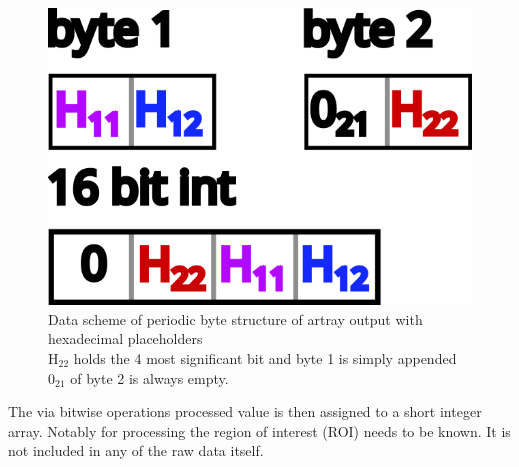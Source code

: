 \documentclass[twoside,openright]{scrreprt}
\begin{document}
\begin{figure}[hbtp]
\centering
\includegraphics[scale=1]{images/ArtrayByteImage.png}
\caption{Data scheme of periodic byte structure of artray output with hexadecimal placeholders\\
$\mathrm{H_{22}}$ holds the 4 most significant bit and byte 1 is simply appended\\
$\mathrm{0_{21}}$ of byte 2 is always empty.\label{fig:ByteArtrayOut}}
\end{figure}

The via bitwise operations processed value is then assigned to a short integer array. Notably for processing the region of interest (ROI) needs to be known. It is not included in any of the raw data itself.
\end{document}
